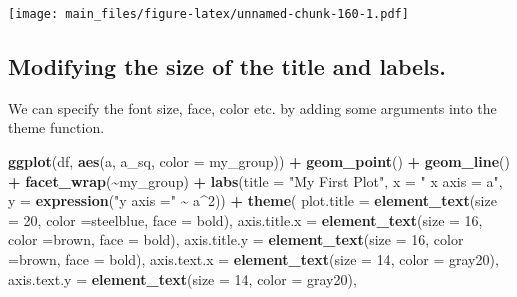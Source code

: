 \documentclass[
]{book}
\newenvironment{Shaded}{\begin{snugshade}}{\end{snugshade}}
\newcommand{\AttributeTok}[1]{\textcolor[rgb]{0.13,0.29,0.53}{#1}}
\newcommand{\DecValTok}[1]{\textcolor[rgb]{0.00,0.00,0.81}{#1}}
\newcommand{\FunctionTok}[1]{\textcolor[rgb]{0.13,0.29,0.53}{\textbf{#1}}}
\newcommand{\NormalTok}[1]{#1}
\newcommand{\SpecialCharTok}[1]{\textcolor[rgb]{0.81,0.36,0.00}{\textbf{#1}}}
\newcommand{\StringTok}[1]{\textcolor[rgb]{0.31,0.60,0.02}{#1}}
\begin{document}
\texttt{[image: main\_files/figure-latex/unnamed-chunk-160-1.pdf]}

\subsection{Modifying the size of the title and labels.}\label{modifying-the-size-of-the-title-and-labels.}

We can specify the font size, face, color etc. by adding some arguments into the theme function.

\begin{Shaded}
\begin{Highlighting}[]
\FunctionTok{ggplot}\NormalTok{(df, }\FunctionTok{aes}\NormalTok{(a, a\_sq, }\AttributeTok{color =}\NormalTok{ my\_group)) }\SpecialCharTok{+} \FunctionTok{geom\_point}\NormalTok{()  }\SpecialCharTok{+} \FunctionTok{geom\_line}\NormalTok{() }\SpecialCharTok{+} \FunctionTok{facet\_wrap}\NormalTok{(}\SpecialCharTok{\textasciitilde{}}\NormalTok{my\_group) }\SpecialCharTok{+}
  \FunctionTok{labs}\NormalTok{(}\AttributeTok{title =} \StringTok{"My First Plot"}\NormalTok{, }\AttributeTok{x =} \StringTok{" x axis = a"}\NormalTok{, }\AttributeTok{y =} \FunctionTok{expression}\NormalTok{(}\StringTok{"y axis ="} \SpecialCharTok{\textasciitilde{}}\NormalTok{ a}\SpecialCharTok{\^{}}\DecValTok{2}\NormalTok{)) }\SpecialCharTok{+}
  \FunctionTok{theme}\NormalTok{(}
    \AttributeTok{plot.title =} \FunctionTok{element\_text}\NormalTok{(}\AttributeTok{size =} \DecValTok{20}\NormalTok{, }\AttributeTok{color =}\StringTok{\textquotesingle{}steelblue\textquotesingle{}}\NormalTok{, }\AttributeTok{face =} \StringTok{\textquotesingle{}bold\textquotesingle{}}\NormalTok{),}
    \AttributeTok{axis.title.x =} \FunctionTok{element\_text}\NormalTok{(}\AttributeTok{size =} \DecValTok{16}\NormalTok{, }\AttributeTok{color =}\StringTok{\textquotesingle{}brown\textquotesingle{}}\NormalTok{, }\AttributeTok{face =} \StringTok{\textquotesingle{}bold\textquotesingle{}}\NormalTok{),}
    \AttributeTok{axis.title.y =} \FunctionTok{element\_text}\NormalTok{(}\AttributeTok{size =} \DecValTok{16}\NormalTok{, }\AttributeTok{color =}\StringTok{\textquotesingle{}brown\textquotesingle{}}\NormalTok{, }\AttributeTok{face =} \StringTok{\textquotesingle{}bold\textquotesingle{}}\NormalTok{),}
    \AttributeTok{axis.text.x =} \FunctionTok{element\_text}\NormalTok{(}\AttributeTok{size =} \DecValTok{14}\NormalTok{, }\AttributeTok{color =} \StringTok{\textquotesingle{}gray20\textquotesingle{}}\NormalTok{),}
    \AttributeTok{axis.text.y =} \FunctionTok{element\_text}\NormalTok{(}\AttributeTok{size =} \DecValTok{14}\NormalTok{, }\AttributeTok{color =} \StringTok{\textquotesingle{}gray20\textquotesingle{}}\NormalTok{),}

\end{Highlighting}
\end{Shaded}
\end{document}
